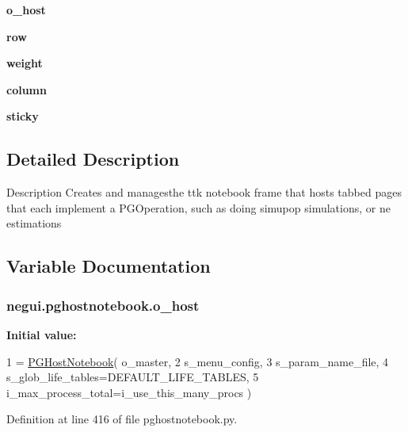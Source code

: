 \begin{DoxyCompactItemize}
\item 
{\bfseries o\+\_\+host}
\item 
{\bfseries row}\hypertarget{namespacenegui_1_1pghostnotebook_abbdb0eca27e7301cb04d4e404a1325e5}{}\label{namespacenegui_1_1pghostnotebook_abbdb0eca27e7301cb04d4e404a1325e5}

\item 
{\bfseries weight}\hypertarget{namespacenegui_1_1pghostnotebook_ad128d121aeac1b79c3f0f86d1fd8131c}{}\label{namespacenegui_1_1pghostnotebook_ad128d121aeac1b79c3f0f86d1fd8131c}

\item 
{\bfseries column}\hypertarget{namespacenegui_1_1pghostnotebook_a6c203ea581355857a12fad081c23c08a}{}\label{namespacenegui_1_1pghostnotebook_a6c203ea581355857a12fad081c23c08a}

\item 
{\bfseries sticky}\hypertarget{namespacenegui_1_1pghostnotebook_a5b7b1e279a09dd3ad592ac50862c7886}{}\label{namespacenegui_1_1pghostnotebook_a5b7b1e279a09dd3ad592ac50862c7886}

\end{DoxyCompactItemize}


\subsection{Detailed Description}
\begin{DoxyVerb}Description
Creates and managesthe ttk notebook frame
that hosts tabbed pages that each implement 
a PGOperation, such as doing simupop simulations,
or ne estimations
\end{DoxyVerb}
 

\subsection{Variable Documentation}
\subsubsection[{\texorpdfstring{o\+\_\+host}{o_host}}]{\setlength{\rightskip}{0pt plus 5cm}negui.\+pghostnotebook.\+o\+\_\+host}\hypertarget{namespacenegui_1_1pghostnotebook_a90452a51dfebcdcd89ed5eccb9094fe7}{}\label{namespacenegui_1_1pghostnotebook_a90452a51dfebcdcd89ed5eccb9094fe7}
{\bfseries Initial value\+:}
\begin{DoxyCode}
1 = \hyperlink{classnegui_1_1pghostnotebook_1_1PGHostNotebook}{PGHostNotebook}( o\_master, 
2             s\_menu\_config, 
3             s\_param\_name\_file, 
4             s\_glob\_life\_tables=DEFAULT\_LIFE\_TABLES,
5             i\_max\_process\_total=i\_use\_this\_many\_procs )
\end{DoxyCode}


Definition at line 416 of file pghostnotebook.\+py.

